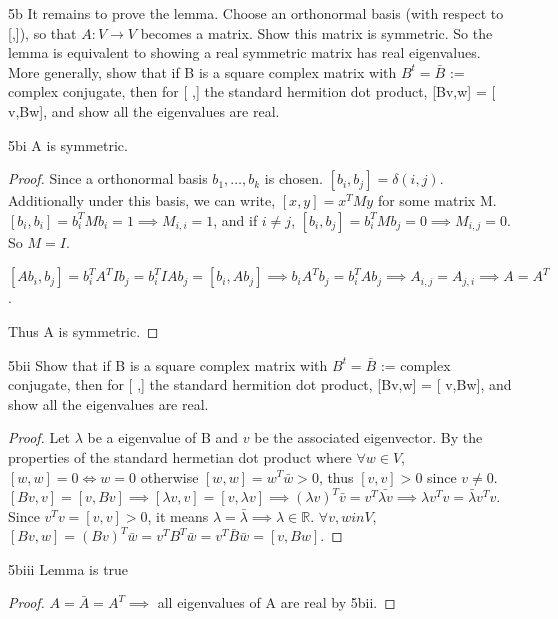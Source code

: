 \documentclass{article}
\newcommand{\R}{\mathbb{R}}
\begin{document}
\begin{PROB}{5b}\label{Problem 5b.}
    It remains to prove the lemma. Choose an orthonormal basis (with respect to [,]), so that $A:V \to V$ becomes a matrix. Show this matrix is symmetric. So the lemma is equivalent to showing a real symmetric matrix has real eigenvalues.  More generally, show that if B is a square complex matrix with $B^t = \bar B$ := complex conjugate, then for [ ,] the standard hermition dot product, [Bv,w] = [ v,Bw], and show all the eigenvalues are real. 
\end{PROB}
\begin{claim}{5bi}\label{Claim 5bi.}
    A is symmetric. 
\end{claim}
\begin{proof}
    Since a orthonormal basis $b_1, \dots, b_k$ is chosen. $[b_i, b_j] = \delta(i, j)$. Additionally under this basis, we can write, $[x, y] = x^TMy$ for some matrix M. $[b_i, b_i]= b_i^TMb_i = 1 \implies M_{i, i} = 1$, and if $i \neq j$, $[b_i, b_j] = b_i^T M b_j = 0 \implies M_{i, j} = 0$. So $M = I$. 
    
    $[Ab_i, b_j] = b_i^T A^T I b_j = b_i^T I A b_j = [b_i, Ab_j] \implies b_i A^T b_j = b_i^T A b_j \implies A_{i,j} = A_{j, i} \implies A = A^T$.

    Thus A is symmetric.
\end{proof}
\begin{claim}{5bii}\label{Claim 5bii.}
    Show that if B is a square complex matrix with $B^t = \bar B$ := complex conjugate, then for [ ,] the standard hermition dot product, [Bv,w] = [ v,Bw], and show all the eigenvalues are real.
\end{claim}
\begin{proof}
    Let $\lambda$ be a eigenvalue of B and $v$ be the associated eigenvector. By the properties of the standard hermetian dot product where $\forall w \in V$, $[w, w] = 0 \iff w = 0$ otherwise $[w, w] = w^T \bar{w} > 0$, thus $[v, v] > 0$ since $v \neq 0$.  $[Bv, v] = [v, Bv] \implies [\lambda v, v] = [v, \lambda v] \implies (\lambda v)^T\bar{v} = v^T \bar{\lambda v} \implies \lambda v^T v = \bar{\lambda} v^T v$. Since $v^Tv = [v, v] > 0$, it means $\lambda = \bar{\lambda} \implies \lambda \in \R$. $\forall v, w in V$, $[Bv, w] = (Bv)^T \bar{w} = v^T B^T \bar{w} = v^T \bar{B} \bar{w}= [v, Bw]$.    
\end{proof}
\begin{claim}{5biii}\label{Claim 5biii.}
    Lemma is true
\end{claim}
\begin{proof}
    $A = \bar{A} = A^T \implies$ all eigenvalues of A are real by 5bii.  
\end{proof}
\end{document}
